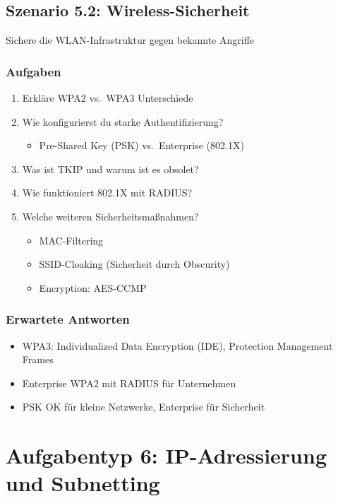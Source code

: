 \documentclass[12pt,a4paper,german]{report}
\begin{document}
\section{Szenario 5.2: Wireless-Sicherheit}

Sichere die WLAN-Infrastruktur gegen bekannte Angriffe

\subsection{Aufgaben}
\begin{enumerate}
    \item Erkläre WPA2 vs.\ WPA3 Unterschiede
    \item Wie konfigurierst du starke Authentifizierung?
    \begin{itemize}
        \item Pre-Shared Key (PSK) vs.\ Enterprise (802.1X)
    \end{itemize}
    \item Was ist TKIP und warum ist es obsolet?
    \item Wie funktioniert 802.1X mit RADIUS?
    \item Welche weiteren Sicherheitsmaßnahmen?
    \begin{itemize}
        \item MAC-Filtering
        \item SSID-Cloaking (Sicherheit durch Obscurity)
        \item Encryption: AES-CCMP
    \end{itemize}
\end{enumerate}

\subsection{Erwartete Antworten}
\begin{itemize}
    \item WPA3: Individualized Data Encryption (IDE), Protection Management Frames
    \item Enterprise WPA2 mit RADIUS für Unternehmen
    \item PSK OK für kleine Netzwerke, Enterprise für Sicherheit
\end{itemize}

\chapter{Aufgabentyp 6: IP-Adressierung und Subnetting}
\end{document}
